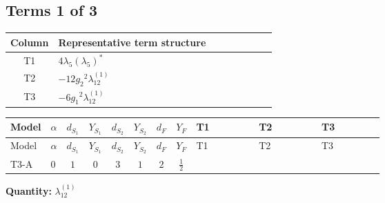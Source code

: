 \documentclass[8pt]{article}
\begin{document}
\begin{landscape}
\subsection*{Terms 1 of 3}
\begin{center}
\begin{tabular}{@{}c >{\raggedright\arraybackslash}p{0.82\linewidth}@{}}
\toprule
Column & Representative term structure \\
\midrule
T1 & \(\displaystyle 4 {\lambda_5} \left({\lambda_5}\right)^{*}\) \\
\midrule
T2 & \(\displaystyle -12 {g_2}^2 {\lambda_{12}^{(1)}}\) \\
\midrule
T3 & \(\displaystyle -6 {g_1}^2 {\lambda_{12}^{(1)}}\) \\
\midrule
\bottomrule
\end{tabular}
\end{center}
\smallskip
\tiny
\begin{longtable}{@{}llcccccc >{\raggedright\arraybackslash}p{0.21\linewidth} >{\raggedright\arraybackslash}p{0.21\linewidth} >{\raggedright\arraybackslash}p{0.21\linewidth}@{}}
\toprule
Model & $\alpha$ & $d_{S_1}$ & $Y_{S_1}$ & $d_{S_2}$ & $Y_{S_2}$ & $d_F$ & $Y_F$ & T1 & T2 & T3 \\
\midrule
\endfirsthead
\toprule
Model & $\alpha$ & $d_{S_1}$ & $Y_{S_1}$ & $d_{S_2}$ & $Y_{S_2}$ & $d_F$ & $Y_F$ & T1 & T2 & T3 \\
\midrule
\endhead
T3-A & $0$ & $1$ & $0$ & $3$ & $1$ & $2$ & $\frac{1}{2}$ & \scriptsize\adjustbox{max width=\linewidth}{$\begin{gathered} 4 {\lambda_5} \left({\lambda_5}\right)^{*}\end{gathered}$} & \scriptsize\adjustbox{max width=\linewidth}{$\begin{gathered} -12 {g_2}^2 {\lambda_{12}^{(1)}}\end{gathered}$} & \scriptsize\adjustbox{max width=\linewidth}{$\begin{gathered} -6 {g_1}^2 {\lambda_{12}^{(1)}}\end{gathered}$} \\
\midrule
\bottomrule
\end{longtable}
\clearpage
\noindent\textbf{Quantity: }$\lambda_{12}^{(1)}$\par\smallskip

\end{landscape}
\end{document}
